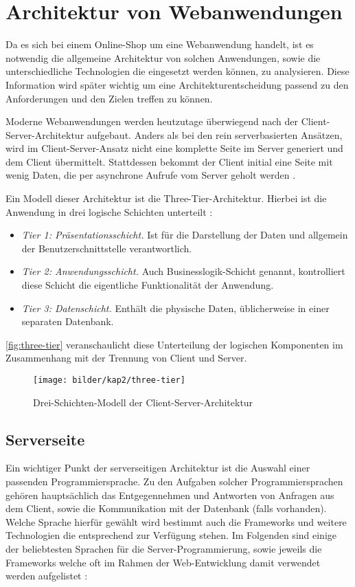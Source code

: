 \section{Architektur von Webanwendungen}\label{web_architecture} \thispagestyle{nomarkstyle}
Da es sich bei einem Online-Shop um eine Webanwendung handelt, ist es notwendig die allgemeine Architektur von solchen Anwendungen, sowie die unterschiedliche Technologien die eingesetzt werden können, zu analysieren. Diese Information wird später wichtig um eine  Architekturentscheidung passend zu den Anforderungen und den Zielen treffen zu können.

Moderne Webanwendungen werden heutzutage überwiegend nach der Client-Server-Architektur aufgebaut. Anders als bei den rein serverbasierten Ansätzen, wird im Client-Server-Ansatz nicht eine komplette Seite im Server generiert und dem Client übermittelt. Stattdessen bekommt der Client initial eine Seite mit wenig Daten, die per asynchrone Aufrufe vom Server geholt werden \cite{Saternos2014}.

Ein Modell dieser Architektur ist die Three-Tier-Architektur. Hierbei ist die Anwendung in drei logische Schichten unterteilt \cite{Techopedia2017}:
\begin{itemize}
	\item \textit{Tier 1: Präsentationsschicht.} Ist für die Darstellung der Daten und allgemein der Benutzerschnittstelle verantwortlich.
	\item \textit{Tier 2: Anwendungsschicht.} Auch Businesslogik-Schicht genannt, kontrolliert diese Schicht die eigentliche Funktionalität der Anwendung.
	\item \textit{Tier 3: Datenschicht.} Enthält die physische Daten, üblicherweise in einer separaten Datenbank.
\end{itemize}

\autoref{fig:three-tier} veranschaulicht diese Unterteilung der logischen Komponenten im Zusammenhang mit der Trennung von Client und Server. %

\begin{figure}[ht!]
	\centering
	\texttt{[image: bilder/kap2/three-tier]}
	\caption{Drei-Schichten-Modell der Client-Server-Architektur \cite{Conallen2000}}
	\label{fig:three-tier}
\end{figure}

\subsection{Serverseite}
Ein wichtiger Punkt der serverseitigen Architektur ist die Auswahl einer passenden Programmiersprache. Zu den Aufgaben solcher Programmiersprachen gehören hauptsächlich das Entgegennehmen und Antworten von Anfragen aus dem Client, sowie die Kommunikation mit der Datenbank (falls vorhanden). Welche Sprache hierfür gewählt wird bestimmt auch die Frameworks und weitere Technologien die entsprechend zur Verfügung stehen. Im Folgenden sind einige der beliebtesten Sprachen für die Server-Programmierung, sowie jeweils die Frameworks welche oft im Rahmen der Web-Entwicklung damit verwendet werden aufgelistet \cite{School2016}:

